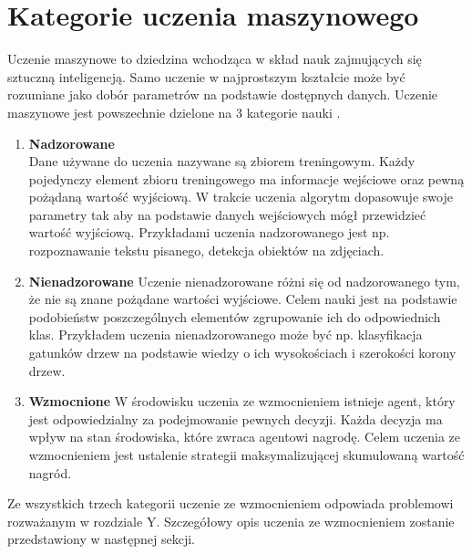 \documentclass[12pt]{book}
\theoremstyle{plain}
\begin{document}
\section{Kategorie uczenia maszynowego}
Uczenie maszynowe to dziedzina wchodząca w skład nauk zajmujących się sztuczną inteligencją. Samo uczenie w najprostszym kształcie może być rozumiane jako dobór parametrów na podstawie dostępnych danych. Uczenie maszynowe jest powszechnie dzielone na 3 kategorie nauki \cite{machineLearningClassification}.
\begin{enumerate}
\item \textbf{Nadzorowane} \\
Dane używane do uczenia nazywane są zbiorem treningowym. Każdy pojedynczy element zbioru treningowego ma informacje wejściowe oraz pewną pożądaną wartość wyjściową. W trakcie uczenia algorytm dopasowuje swoje parametry tak aby na podstawie danych wejściowych mógł przewidzieć wartość wyjściową. Przykładami uczenia nadzorowanego jest np. rozpoznawanie tekstu pisanego, detekcja obiektów na zdjęciach.
\item \textbf{Nienadzorowane}
Uczenie nienadzorowane różni się od nadzorowanego tym, że nie  są znane pożądane wartości wyjściowe. Celem nauki jest na podstawie podobieństw poszczególnych elementów zgrupowanie ich do odpowiednich klas. Przykładem uczenia nienadzorowanego może być np. klasyfikacja gatunków drzew na podstawie wiedzy o ich wysokościach i szerokości korony drzew.
\item \textbf{Wzmocnione}
W środowisku uczenia ze wzmocnieniem istnieje agent, który jest odpowiedzialny za podejmowanie pewnych decyzji. Każda decyzja ma wpływ na stan środowiska, które zwraca agentowi nagrodę. Celem uczenia ze wzmocnieniem jest ustalenie strategii maksymalizującej skumulowaną wartość nagród.
\end{enumerate}
Ze wszystkich trzech kategorii uczenie ze wzmocnieniem odpowiada problemowi rozważanym w rozdziale Y. Szczegółowy opis uczenia ze wzmocnieniem zostanie przedstawiony w następnej sekcji.
\end{document}
